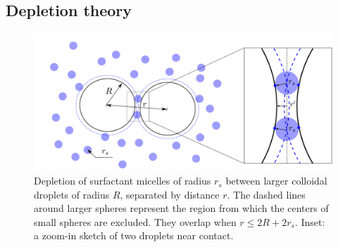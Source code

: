 \subsection{Depletion theory}

\begin{figure}[t]
 \centering
 \includegraphics[width=0.9\columnwidth]{figs/depletion4.pdf}
 \caption{Depletion of surfactant micelles of radius $r_s$ between larger colloidal droplets of radius $R$, separated by distance $r$. The dashed lines around larger spheres represent the region from which the centers of small spheres are excluded. They overlap when $r \leqslant 2R+2r_s$. Inset: a zoom-in sketch of two droplets near contact.}
 \label{fig: depl theory}
\end{figure}

